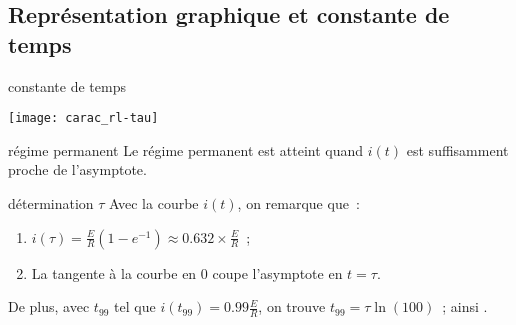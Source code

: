 \documentclass[../main/main.tex]{subfiles}
\begin{document}
\subsection{Représentation graphique et constante de temps}
\begin{tcbraster}[raster columns=2, raster equal height=rows]
    \begin{impl}[label=impl:tauRC]{constante de temps}
        \begin{center}
            \texttt{[image: carac\_rl-tau]}
        \end{center}
    \end{impl}
    \begin{tcolorbox}[blankest, raster multicolumn=1]%
        \begin{tcbraster}[raster columns=1]
            \begin{defi}[label=def:regmperma]{régime permanent}
                Le régime permanent est atteint quand $i(t)$ est
                suffisamment proche de l'asymptote.
            \end{defi}
            \begin{exem}[label=impl:déterm]{détermination $\tau$}
                Avec la courbe $i(t)$, on remarque que~:
                \begin{enumerate}
                    \item $i(\tau) = \frac{E}{R} \left( 1-e^{-1} \right) \approx
                        \num{0.632}\times \frac{E}{R}$~;
                    \item La tangente à la courbe en 0 coupe l'asymptote en
                        $t = \tau$.
                \end{enumerate}
                De plus, avec $t_{99}$ tel que $i(t_{99}) =
                \num{0.99}\frac{E}{R}$, on trouve $t_{99} = \tau\ln(100)$~;
                ainsi .
            \end{exem}
        \end{tcbraster}
    \end{tcolorbox}
\end{tcbraster}
\end{document}
